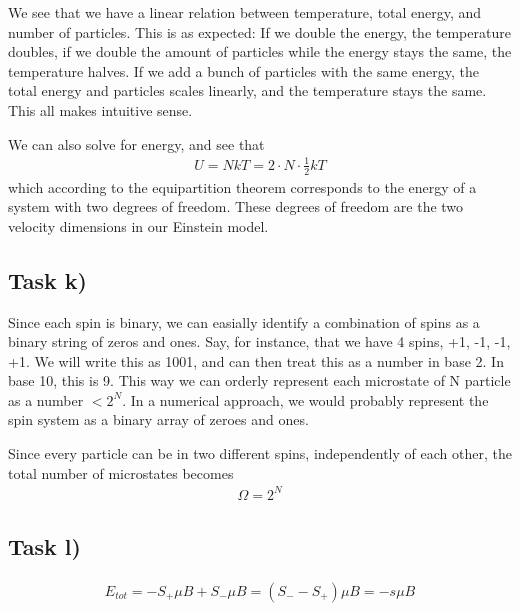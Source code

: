 \documentclass[12p,a4paper]{article}
\begin{document}
We see that we have a linear relation between temperature, total energy, and number of particles. This is as expected: If we double the energy, the temperature doubles, if we double the amount of particles while the energy stays the same, the temperature halves. If we add a bunch of particles with the same energy, the total energy and particles scales linearly, and the temperature stays the same. This all makes intuitive sense.

We can also solve for energy, and see that
\begin{align*}
    U = NkT = 2\cdot N\cdot \frac{1}{2}kT
\end{align*}
which according to the equipartition theorem corresponds to the energy of a system with two degrees of freedom. These degrees of freedom are the two velocity dimensions in our Einstein model.


\subsection*{Task k)}
Since each spin is binary, we can easially identify a combination of spins as a binary string of zeros and ones. Say, for instance, that we have 4 spins, +1, -1, -1, +1. We will write this as 1001, and can then treat this as a number in base 2. In base 10, this is 9. This way we can orderly represent each microstate of N particle as a number $< 2^N$. In a numerical approach, we would probably represent the spin system as a binary array of zeroes and ones.

Since every particle can be in two different spins, independently of each other, the total number of microstates becomes
\begin{align*}
    \Omega = 2^N
\end{align*}


\subsection*{Task l)}
\begin{align*}
    E_{tot} = -S_+\mu B + S_-\mu B = (S_- - S_+)\mu B = -s\mu B
\end{align*}
\end{document}
